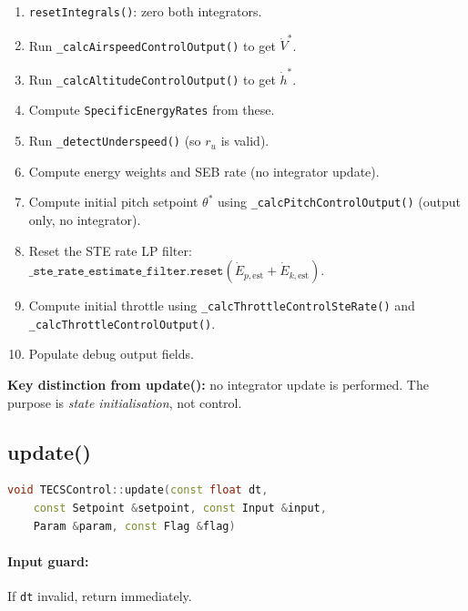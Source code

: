 \documentclass[12pt,a4paper]{article}
\begin{document}
\begin{enumerate}
  \item \texttt{resetIntegrals()}: zero both integrators.
  \item Run \texttt{\_calcAirspeedControlOutput()} to get $\dot{V}^*$.
  \item Run \texttt{\_calcAltitudeControlOutput()} to get $\dot{h}^*$.
  \item Compute \texttt{SpecificEnergyRates} from these.
  \item Run \texttt{\_detectUnderspeed()} (so $r_u$ is valid).
  \item Compute energy weights and SEB rate (no integrator update).
  \item Compute initial pitch setpoint $\theta^*$ using
        \texttt{\_calcPitchControlOutput()} (output only, no integrator).
  \item Reset the STE rate LP filter:
        $\texttt{\_ste\_rate\_estimate\_filter.reset}(\dot{E}_{p,\text{est}}
        + \dot{E}_{k,\text{est}})$.
  \item Compute initial throttle using
        \texttt{\_calcThrottleControlSteRate()} and
        \texttt{\_calcThrottleControlOutput()}.
  \item Populate debug output fields.
\end{enumerate}

\textbf{Key distinction from update():} no integrator update is performed.
The purpose is \emph{state initialisation}, not control.

\subsection{update()}

\begin{lstlisting}[language=C++]
void TECSControl::update(const float dt,
    const Setpoint &setpoint, const Input &input,
    Param &param, const Flag &flag)
\end{lstlisting}

\paragraph{Input guard:} If \texttt{dt} invalid, return immediately.
\end{document}
